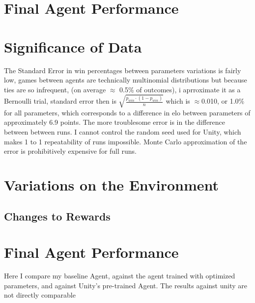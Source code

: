 \section{Final Agent Performance}


\section{Significance of Data}
The Standard Error in win percentages between parameters variations is fairly low, games between agents are technically multinomial distributions but because ties are so infrequent, (on average $\approx$ 0.5\% of outcomes), i aprroximate it as a Bernoulli trial, standard error then is $\sqrt{\frac{p_{win} \cdot (1 - p_{win})}{n}}$ which is $\approx$0.010, or 1.0\% for all parameters, which corresponds to a difference in elo between parameters of approximately 6.9 points. The more troublesome error is in the difference between between runs. I cannot control the random seed used for Unity, which makes 1 to 1 repeatability of runs impossible. Monte Carlo approximation of the error is prohibitively expensive for full runs.



\section{Variations on the Environment}\label{sec:tr:variations}
\subsection{Changes to Rewards}\label{subsec:tr:env:rewards}
\section{Final Agent Performance}
Here I compare my baseline Agent, against the agent trained with optimized parameters, and against Unity's pre-trained Agent. The results against unity are not directly comparable 

